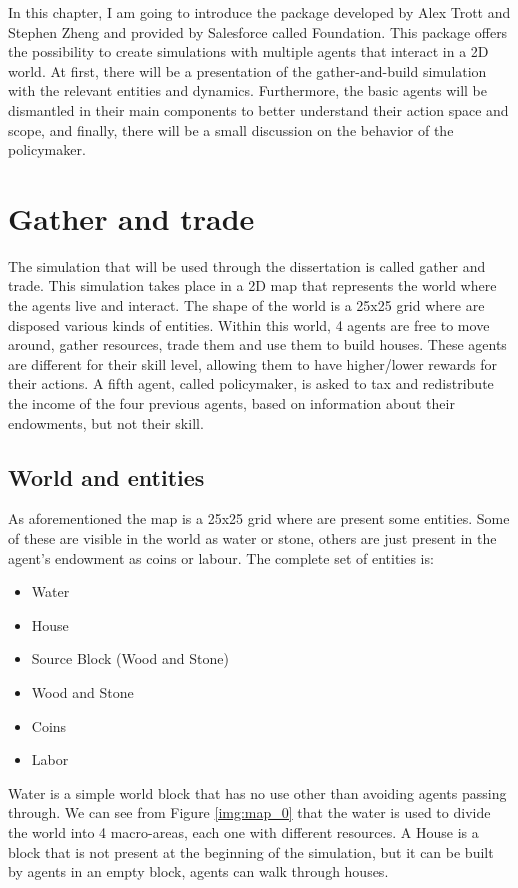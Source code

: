 In this chapter, I am going to introduce the package developed by Alex Trott and Stephen Zheng and provided by Salesforce called Foundation\cite{zheng2020ai}. This package offers the possibility to create simulations with multiple agents that interact in a 2D world. At first, there will be a presentation of the gather-and-build simulation with the relevant entities and dynamics. Furthermore, the basic agents will be dismantled in their main components to better understand their action space and scope, and finally, there will be a small discussion on the behavior of the policymaker.

\section{Gather and trade}

The simulation that will be used through the dissertation is called gather and trade. This simulation takes place in a 2D map that represents the world where the agents live and interact. The shape of the world is a 25x25 grid where are disposed various kinds of entities. Within this world, 4 agents are free to move around, gather resources, trade them and use them to build houses. These agents are different for their skill level, allowing them to have higher/lower rewards for their actions. A fifth agent, called policymaker, is asked to tax and redistribute the income of the four previous agents, based on information about their endowments, but not their skill.

\subsection{World and entities}

As aforementioned the map is a 25x25 grid where are present some entities. Some of these are visible in the world as water or stone, others are just present in the agent's endowment as coins or labour. The complete set of entities is:

\begin{itemize}
    \item Water
    \item House
    \item Source Block (Wood and Stone)
    \item Wood and Stone
    \item Coins
    \item Labor
\end{itemize}

Water is a simple world block that has no use other than avoiding agents passing through. We can see from Figure \ref{img:map_0} that the water is used to divide the world into 4 macro-areas, each one with different resources. 
A House is a block that is not present at the beginning of the simulation, but it can be built by agents in an empty block, agents can walk through houses.

